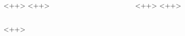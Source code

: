 \begin{columns}
    \begin{column}{<++>\textwidth}
        <++>
    \end{column}
    \begin{column}{<++>\textwidth}
        <++>
    \end{column}
\end{columns}
<++>
